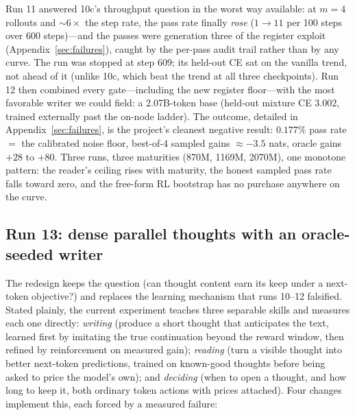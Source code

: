 \documentclass{article} %
\begin{document}
Run 11 answered 10c's throughput question in the worst way available: at $m{=}4$ rollouts and ${\sim}6\times$ the step rate, the pass rate finally \emph{rose} ($1 \to 11$ per 100 steps over 600 steps)---and the passes were generation three of the register exploit (Appendix~\ref{sec:failures}), caught by the per-pass audit trail rather than by any curve. The run was stopped at step 609; its held-out CE sat on the vanilla trend, not ahead of it (unlike 10c, which beat the trend at all three checkpoints). Run 12 then combined every gate---including the new register floor---with the most favorable writer we could field: a 2.07B-token base (held-out mixture CE $3.002$, trained externally past the on-node ladder). The outcome, detailed in Appendix~\ref{sec:failures}, is the project's cleanest negative result: $0.177\%$ pass rate $=$ the calibrated noise floor, best-of-4 sampled gains ${\approx}{-}3.5$ nats, oracle gains $+28$ to $+80$. Three runs, three maturities (870M, 1169M, 2070M), one monotone pattern: the reader's ceiling rises with maturity, the honest sampled pass rate falls toward zero, and the free-form RL bootstrap has no purchase anywhere on the curve.

\subsection{Run 13: dense parallel thoughts with an oracle-seeded writer}
\label{sec:densepar}

The redesign keeps the question (can thought content earn its keep under a next-token objective?) and replaces the learning mechanism that runs 10--12 falsified. Stated plainly, the current experiment teaches three separable skills and measures each one directly: \emph{writing} (produce a short thought that anticipates the text, learned first by imitating the true continuation beyond the reward window, then refined by reinforcement on measured gain); \emph{reading} (turn a visible thought into better next-token predictions, trained on known-good thoughts before being asked to price the model's own); and \emph{deciding} (when to open a thought, and how long to keep it, both ordinary token actions with prices attached). Four changes implement this, each forced by a measured failure:
\end{document}
